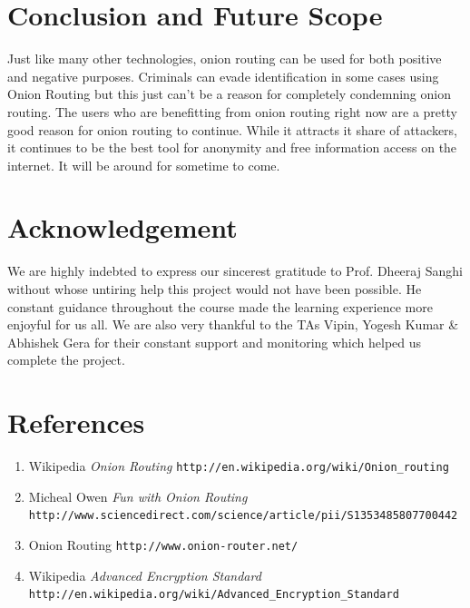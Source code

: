 \documentclass{article}
\begin{document}
\section{Conclusion and Future Scope}
Just like many other technologies, onion routing can be used for both positive and negative purposes. Criminals can evade identification in some cases using Onion Routing but this just can't be a reason for completely condemning onion routing. The users who are benefitting from onion routing right now are a pretty good reason for onion routing to continue. While it attracts it share of attackers, it continues to be the best tool for anonymity and free information access on the internet. It will be around for sometime to come.
\section{Acknowledgement}
We are highly indebted to express our sincerest gratitude to Prof. Dheeraj Sanghi without whose untiring help this project would not have been possible. He constant guidance throughout the course made the learning experience more enjoyful for us all. We are also very thankful to the TAs Vipin, Yogesh Kumar \& Abhishek Gera for their constant support and monitoring which helped us complete the project.
\section{References}
\begin{enumerate}
 \item Wikipedia \textit{Onion Routing} \texttt{http://en.wikipedia.org/wiki/Onion\_routing}
 \item Micheal Owen \textit{Fun with Onion Routing} \newline \texttt{http://www.sciencedirect.com/science/article/pii/S1353485807700442}
 \item Onion Routing \texttt{http://www.onion-router.net/}
 \item Wikipedia \textit{Advanced Encryption Standard} \newline \texttt{http://en.wikipedia.org/wiki/Advanced\_Encryption\_Standard}
\end{enumerate}
\end{document}
